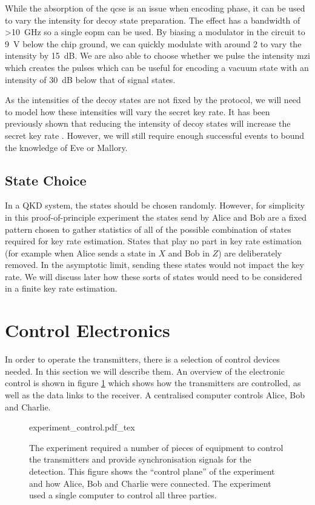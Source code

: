 While the absorption of the \ac{qcse} is an issue when encoding phase, it can be used to vary the intensity for decoy state preparation. The effect has a bandwidth of \SI{>10}{\GHz} so a single \ac{eopm} can be used. By biasing a modulator in the circuit to \SI{9}{\V} below the chip ground, we can quickly modulate with around \SI{2}{\Vpp} to vary the intensity by \SI{15}{dB}. We are also able to choose whether we pulse the intensity \ac{mzi} which creates the pulses which can be useful for encoding a vacuum state with an intensity of \SI{30}{dB} below that of signal states.

As the intensities of the decoy states are not fixed by the protocol, we will need to model how these intensities will vary the secret key rate. It has been previously shown that reducing the intensity of decoy states will increase the secret key rate \cite{Chan2014}. However, we will still require enough successful events to bound the knowledge of Eve or Mallory.

\subsection{State Choice}

In a \ac{QKD} system, the states should be chosen randomly. However, for simplicity in this proof-of-principle experiment the states send by Alice and Bob are a fixed pattern chosen to gather statistics of all of the possible combination of states required for key rate estimation. States that play no part in key rate estimation (for example when Alice sends a state in $X$ and Bob in $Z$) are deliberately removed. In the asymptotic limit, sending these states would not impact the key rate. We will discuss later how these sorts of states would need to be considered in a finite key rate estimation.

\section{Control Electronics}

In order to operate the transmitters, there is a selection of control devices needed. In this section we will describe them. An overview of the electronic control is shown in figure \ref{fig:exp_control} which shows how the transmitters are controlled, as well as the data links to the receiver. A centralised computer controls Alice, Bob and Charlie. 

\begin{figure}[t]
	\centering
	\large
	\def\svgwidth{\textwidth} 
	{experiment_control.pdf_tex}
	\caption[Control electronic schematic of the MDI-QKD experiment]{The experiment required a number of pieces of equipment to control the transmitters and provide synchronisation signals for the detection. This figure shows the ``control plane'' of the experiment and how Alice, Bob and Charlie were connected. The experiment used a single computer to control all three parties.}
	\label{fig:exp_control}
\end{figure}


